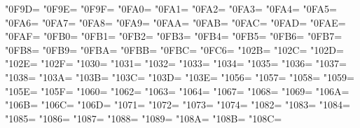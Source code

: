 \XeTeXcharclass"0F9D=\KclassCM
\XeTeXcharclass"0F9E=\KclassCM
\XeTeXcharclass"0F9F=\KclassCM
\XeTeXcharclass"0FA0=\KclassCM
\XeTeXcharclass"0FA1=\KclassCM
\XeTeXcharclass"0FA2=\KclassCM
\XeTeXcharclass"0FA3=\KclassCM
\XeTeXcharclass"0FA4=\KclassCM
\XeTeXcharclass"0FA5=\KclassCM
\XeTeXcharclass"0FA6=\KclassCM
\XeTeXcharclass"0FA7=\KclassCM
\XeTeXcharclass"0FA8=\KclassCM
\XeTeXcharclass"0FA9=\KclassCM
\XeTeXcharclass"0FAA=\KclassCM
\XeTeXcharclass"0FAB=\KclassCM
\XeTeXcharclass"0FAC=\KclassCM
\XeTeXcharclass"0FAD=\KclassCM
\XeTeXcharclass"0FAE=\KclassCM
\XeTeXcharclass"0FAF=\KclassCM
\XeTeXcharclass"0FB0=\KclassCM
\XeTeXcharclass"0FB1=\KclassCM
\XeTeXcharclass"0FB2=\KclassCM
\XeTeXcharclass"0FB3=\KclassCM
\XeTeXcharclass"0FB4=\KclassCM
\XeTeXcharclass"0FB5=\KclassCM
\XeTeXcharclass"0FB6=\KclassCM
\XeTeXcharclass"0FB7=\KclassCM
\XeTeXcharclass"0FB8=\KclassCM
\XeTeXcharclass"0FB9=\KclassCM
\XeTeXcharclass"0FBA=\KclassCM
\XeTeXcharclass"0FBB=\KclassCM
\XeTeXcharclass"0FBC=\KclassCM
\XeTeXcharclass"0FC6=\KclassCM
\XeTeXcharclass"102B=\KclassCM
\XeTeXcharclass"102C=\KclassCM
\XeTeXcharclass"102D=\KclassCM
\XeTeXcharclass"102E=\KclassCM
\XeTeXcharclass"102F=\KclassCM
\XeTeXcharclass"1030=\KclassCM
\XeTeXcharclass"1031=\KclassCM
\XeTeXcharclass"1032=\KclassCM
\XeTeXcharclass"1033=\KclassCM
\XeTeXcharclass"1034=\KclassCM
\XeTeXcharclass"1035=\KclassCM
\XeTeXcharclass"1036=\KclassCM
\XeTeXcharclass"1037=\KclassCM
\XeTeXcharclass"1038=\KclassCM
\XeTeXcharclass"103A=\KclassCM
\XeTeXcharclass"103B=\KclassCM
\XeTeXcharclass"103C=\KclassCM
\XeTeXcharclass"103D=\KclassCM
\XeTeXcharclass"103E=\KclassCM
\XeTeXcharclass"1056=\KclassCM
\XeTeXcharclass"1057=\KclassCM
\XeTeXcharclass"1058=\KclassCM
\XeTeXcharclass"1059=\KclassCM
\XeTeXcharclass"105E=\KclassCM
\XeTeXcharclass"105F=\KclassCM
\XeTeXcharclass"1060=\KclassCM
\XeTeXcharclass"1062=\KclassCM
\XeTeXcharclass"1063=\KclassCM
\XeTeXcharclass"1064=\KclassCM
\XeTeXcharclass"1067=\KclassCM
\XeTeXcharclass"1068=\KclassCM
\XeTeXcharclass"1069=\KclassCM
\XeTeXcharclass"106A=\KclassCM
\XeTeXcharclass"106B=\KclassCM
\XeTeXcharclass"106C=\KclassCM
\XeTeXcharclass"106D=\KclassCM
\XeTeXcharclass"1071=\KclassCM
\XeTeXcharclass"1072=\KclassCM
\XeTeXcharclass"1073=\KclassCM
\XeTeXcharclass"1074=\KclassCM
\XeTeXcharclass"1082=\KclassCM
\XeTeXcharclass"1083=\KclassCM
\XeTeXcharclass"1084=\KclassCM
\XeTeXcharclass"1085=\KclassCM
\XeTeXcharclass"1086=\KclassCM
\XeTeXcharclass"1087=\KclassCM
\XeTeXcharclass"1088=\KclassCM
\XeTeXcharclass"1089=\KclassCM
\XeTeXcharclass"108A=\KclassCM
\XeTeXcharclass"108B=\KclassCM
\XeTeXcharclass"108C=\KclassCM
